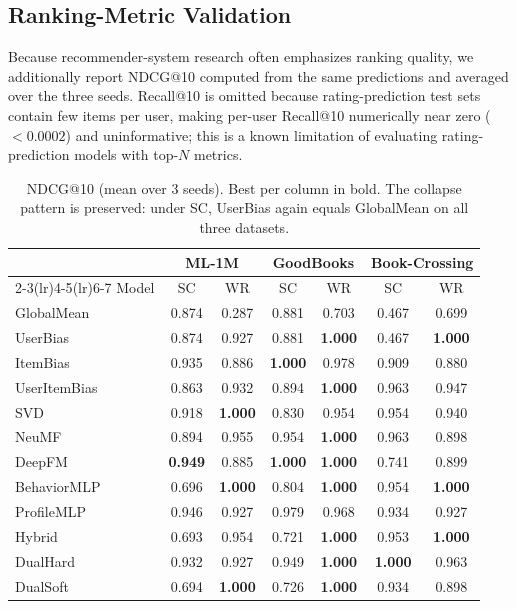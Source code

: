 \documentclass[journal]{IEEEtran}
\begin{document}
\subsection{Ranking-Metric Validation}
\label{sec:ranking_validation}

Because recommender-system research often emphasizes ranking quality, we additionally report NDCG@10 computed from the same predictions and averaged over the three seeds. Recall@10 is omitted because rating-prediction test sets contain few items per user, making per-user Recall@10 numerically near zero ($<\!0.0002$) and uninformative; this is a known limitation of evaluating rating-prediction models with top-$N$ metrics.

\begin{table}[!t]
\centering
\caption{NDCG@10 (mean over 3 seeds). Best per column in bold. The collapse pattern is preserved: under SC, UserBias again equals GlobalMean on all three datasets.}
\label{tab:ndcg}
\footnotesize
\begin{tabular}{@{}lcccccc@{}}
\toprule
& \multicolumn{2}{c}{ML-1M} & \multicolumn{2}{c}{GoodBooks} & \multicolumn{2}{c}{Book-Crossing} \\
\cmidrule(lr){2-3}\cmidrule(lr){4-5}\cmidrule(lr){6-7}
Model & SC & WR & SC & WR & SC & WR \\
\midrule
GlobalMean    & 0.874 & 0.287 & 0.881 & 0.703 & 0.467 & 0.699 \\
UserBias      & 0.874 & 0.927 & 0.881 & \textbf{1.000} & 0.467 & \textbf{1.000} \\
ItemBias      & 0.935 & 0.886 & \textbf{1.000} & 0.978 & 0.909 & 0.880 \\
UserItemBias  & 0.863 & 0.932 & 0.894 & \textbf{1.000} & 0.963 & 0.947 \\
SVD           & 0.918 & \textbf{1.000} & 0.830 & 0.954 & 0.954 & 0.940 \\
NeuMF         & 0.894 & 0.955 & 0.954 & \textbf{1.000} & 0.963 & 0.898 \\
DeepFM        & \textbf{0.949} & 0.885 & \textbf{1.000} & \textbf{1.000} & 0.741 & 0.899 \\
BehaviorMLP   & 0.696 & \textbf{1.000} & 0.804 & \textbf{1.000} & 0.954 & \textbf{1.000} \\
ProfileMLP    & 0.946 & 0.927 & 0.979 & 0.968 & 0.934 & 0.927 \\
Hybrid        & 0.693 & 0.954 & 0.721 & \textbf{1.000} & 0.953 & \textbf{1.000} \\
DualHard      & 0.932 & 0.927 & 0.949 & \textbf{1.000} & \textbf{1.000} & 0.963 \\
DualSoft      & 0.694 & \textbf{1.000} & 0.726 & \textbf{1.000} & 0.934 & 0.898 \\
\bottomrule
\end{tabular}
\end{table}
\end{document}
